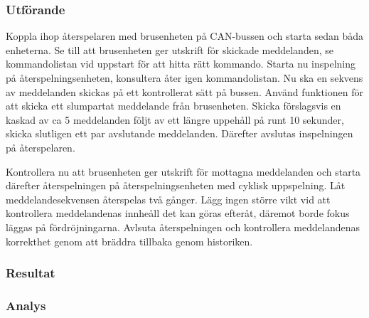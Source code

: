 \subsubsection*{Utförande}
Koppla ihop återspelaren med brusenheten på CAN-bussen och starta sedan båda enheterna.
Se till att brusenheten ger utskrift för skickade meddelanden, se kommandolistan vid uppstart för att hitta rätt kommando.
Starta nu inspelning på återspelningsenheten, konsultera åter igen kommandolistan.
Nu ska en sekvens av meddelanden skickas på ett kontrollerat sätt på bussen.
Använd funktionen för att skicka ett slumpartat meddelande från brusenheten.
Skicka förslagsvis en kaskad av  ca 5 meddelanden följt av ett längre uppehåll på runt 10 sekunder, skicka slutligen ett par avslutande meddelanden.
Därefter avslutas inspelningen på återspelaren.

Kontrollera nu att brusenheten ger utskrift för mottagna meddelanden och starta därefter återspelningen på återspelningsenheten med cyklisk uppspelning.
Låt meddelandesekvensen återspelas två gånger.
Lägg ingen större vikt vid att kontrollera meddelandenas innheåll det kan göras efteråt, däremot borde fokus läggas på fördröjningarna.
Avlsuta återspelningen och kontrollera meddelandenas korrekthet genom att bräddra tillbaka genom historiken.


\subsubsection*{Resultat}



\subsubsection*{Analys}



